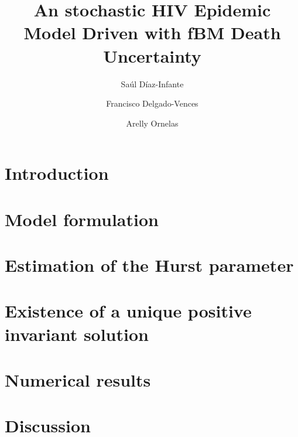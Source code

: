 \documentclass[3p,sort&compress,times]{elsarticle}
\DeclareRobustCommand{\1}[1]{\ensuremath \mathbbm{1}_{\{#1\}}}
\begin{document}
  \begin{frontmatter}
     \author[add:conacyt_unison]{%
      Sa\'ul D\'iaz-Infante
    }%
    \author[add:conacyt_unam]{%
      Francisco Delgado-Vences
    }%
    \author[add:institution]{%
      Arelly Ornelas
    }%
    \address[add:conacyt_unison]{
      CONACYT-Universidad de Sonora, Departamento de Matem\'aticas, Boulevard
      Luis Encinas y Rosales S/N, Col. Centro, Hermosillo, Sonora, 
      M\'exico.
    }
    \address[add:conacyt_unam]{
      CONACYT-UNAM, Instituto de Matem\'aticas, Sede
      Oaxaca, M\'exico.
    }
  \title{An stochastic HIV Epidemic Model Driven with fBM Death Uncertainty}
  \address{}
\begin{abstract}
\end{abstract}%

\begin{keyword}

\end{keyword}

\end{frontmatter}


\section{Introduction} \label{sec:intro}
\section{Model formulation} \label{sec:model_formulation}
\section{Estimation of the Hurst parameter}\label{sec:hurst_parameter}
\section{Existence of a unique positive invariant solution} 
\label{sec:existence}
\section{Numerical results} \label{sec:numerical_results}
\section{Discussion}




  \nocite{*}
   
  
\end{document}
